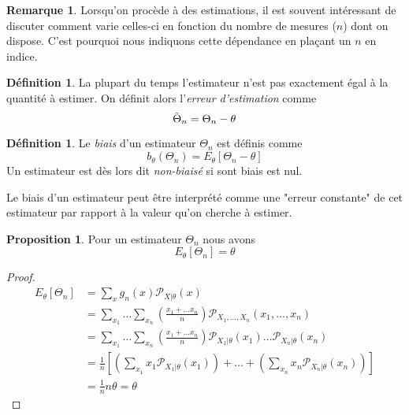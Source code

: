 \documentclass[a4paper,12pt]{report}
\theoremstyle{definition}
\renewcommand{\(}{\left(}
\renewcommand{\)}{\right)}
\renewcommand{\P}{\mathcal{P}}
\renewcommand{\d}{\textit}
\newtheorem{defn}[thm]{Définition}
\newtheorem{rmk}[thm]{Remarque}
\newtheorem{prop}[thm]{Proposition}
\begin{document}
        \begin{rmk}
            Lorsqu'on procède à des estimations, il est souvent intéressant de discuter comment varie celles-ci en fonction du nombre de mesures ($n$) dont on dispose. C'est pourquoi nous indiquons cette dépendance en plaçant un $n$ en indice.
        \end{rmk}
        
        \begin{leftbar}
        \begin{defn}
            La plupart du temps l'estimateur n'est pas exactement égal à la quantité à estimer. On définit alors l'\d{erreur d'estimation} comme
            $$\Tilde{\Theta}_n = \Theta_n-\theta$$
        \end{defn}
        \end{leftbar}
        
        \begin{leftbar}
        \begin{defn}
            Le \d{biais} d'un estimateur $\Theta_n$ est définis comme
            $$b_\theta(\Theta_n) = E_\theta[\Theta_n-\theta]$$
            Un estimateur est dès lors dit \d{non-biaisé} si sont biais est nul.
        \end{defn}
        \end{leftbar}
        Le biais d'un estimateur peut être interprété comme une "erreur constante" de cet estimateur par rapport à la valeur qu'on cherche à estimer.
        \begin{leftbar}
        \begin{prop}Pour un estimateur $\Theta_n$ nous avons 
        $$E_{\theta}[\Theta_n] = \theta$$
        \end{prop}
        \end{leftbar}
        
        \begin{proof}
                \begin{align*}
                    E_{\theta}[\Theta_n] &= \sum_x g_n(x) \P_{X|\theta}(x) \\
                    &= \sum_{x_1}\dots\sum_{x_n}\left( \frac{x_1+\dots x_n}{n}\right) \P_{X_1,\dots,X_n}(x_1,\dots,x_n)\\
                    &=\sum_{x_1}\dots\sum_{x_n}\left( \frac{x_1+\dots x_n}{n} \right) \P_{X_1|\theta}(x_1)\dots\P_{X_n|\theta}(x_n)\\
                    &=\frac{1}{n}\left[\left( \sum_{x_1}x_1 \P_{X_1|\theta}(x_1)\right) + \dots + \left(\sum_{x_n}x_n \P_{X_n|\theta}(x_n)\right) \right]\\
                    &= \frac{1}{n} n\theta = \theta
                \end{align*}
        \end{proof}
        
\end{document}

